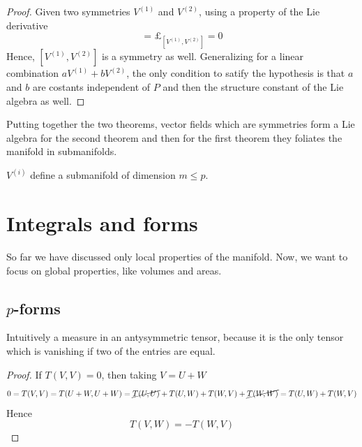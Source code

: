     \begin{proof}

        Given two symmetries $V^{(1)}$ and $V^{(2)}$, using a property of the Lie derivative
        \begin{equation*}
            [\pounds_{V^{(1)}}, \pounds_{V^{(2)}}] = \pounds_{[V^{(1)},V^{(2)}]} = 0
        \end{equation*}
        Hence, $[V^{(1)},V^{(2)}]$ is a symmetry as well. Generalizing for a linear combination $aV^{(1)} + bV^{(2)}$, the only condition to satify the hypothesis is that $a$ and $b$ are costants independent of $P$ and then the structure constant of the Lie algebra as well. 
    \end{proof}

    Putting together the two theorems, vector fields which are symmetries form a Lie algebra for the second theorem and then for the first theorem they foliates the manifold in submanifolds.

    \begin{corollary}
        $V^{(i)}$ define a submanifold of dimension $m \leq p$.
    \end{corollary}

\chapter{Integrals and forms}

    So far we have discussed only local properties of the manifold. Now, we want to focus on global properties, like volumes and areas.

\section{$p$-forms}

    Intuitively a measure in an antysymmetric tensor, because it is the only tensor which is vanishing if two of the entries are equal.

    \begin{proof}
        If $T(V, V) = 0$, then taking $V = U + W$ 
        \begin{equation*}
            0 = T(V, V) = T(U + W,U + W) = \cancel{T(U,U)} + T(U, W) + T(W, V) + \cancel{T(W, W)} = T(U, W) + T(W, V) 
        \end{equation*}
        Hence
        \begin{equation*}
            T(V, W) = - T(W, V)
        \end{equation*}
    \end{proof}

